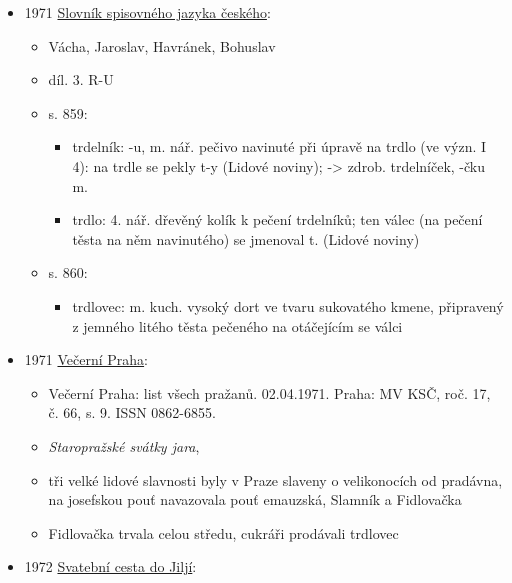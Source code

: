 \begin{itemize}
\begin{itemize}
    \begin{itemize}
    \tightlist
    \item
      Cerka ide do kláštera, hladu má moc tá chudera. Dajte buchty,
      pagáčky, trdelníky, koláčky!
    \end{itemize}
  \end{itemize}
\item
  1971
  \href{https://www.digitalniknihovna.cz/mzk/uuid/uuid:cc9d3280-df2e-11e2-9923-005056827e52}{Slovník
  spisovného jazyka českého}:

  \begin{itemize}
  \tightlist
  \item
    Vácha, Jaroslav, Havránek, Bohuslav
  \item
    díl. 3. R-U
  \item
    s. 859:

    \begin{itemize}
    \tightlist
    \item
      trdelník: -u, m. nář. pečivo navinuté při úpravě na trdlo (ve
      význ. I 4): na trdle se pekly t-y (Lidové noviny); -\textgreater{}
      zdrob. trdelníček, -čku m.
    \item
      trdlo: 4. nář. dřevěný kolík k pečení trdelníků; ten válec (na
      pečení těsta na něm navinutého) se jmenoval t. (Lidové noviny)
    \end{itemize}
  \item
    s. 860:

    \begin{itemize}
    \tightlist
    \item
      trdlovec: m. kuch. vysoký dort ve tvaru sukovatého kmene,
      připravený z jemného litého těsta pečeného na otáčejícím se válci
    \end{itemize}
  \end{itemize}
\item
  1971
  \href{https://ceskadigitalniknihovna.cz/uuid/uuid:20f3da98-81d2-11ec-b27f-001b63bd97ba}{Večerní
  Praha}:

  \begin{itemize}
  \tightlist
  \item
    Večerní Praha: list všech pražanů. 02.04.1971. Praha: MV KSČ, roč.
    17, č. 66, s. 9. ISSN 0862-6855.
  \item
    \emph{Staropražské svátky jara}, 
  \item
    tři velké lidové slavnosti byly v Praze slaveny o velikonocích od
    pradávna, na josefskou pouť navazovala pouť emauzská, Slamník a
    Fidlovačka
  \item
    Fidlovačka trvala celou středu, cukráři prodávali trdlovec
  \end{itemize}
\item
  1972
  \href{https://ceskadigitalniknihovna.cz/view/uuid:7f125360-7a61-11e2-b212-005056827e52?page=uuid:c55826ef-5b0a-c263-256a-4b1ed7dcf198&fulltext=trdeln\%C3\%ADk*\%20OR\%20trdelnjk*&source=mzk}{Svatební
  cesta do Jiljí}:


\end{itemize}
